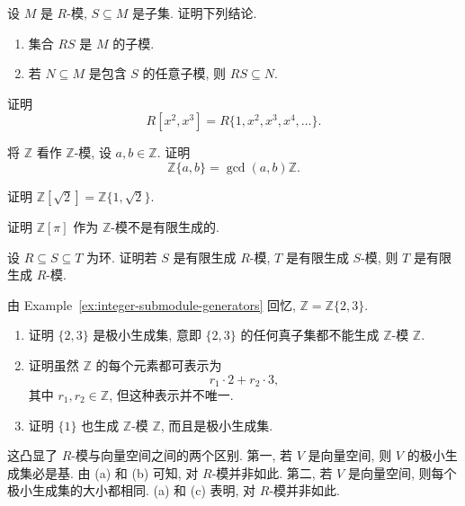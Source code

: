 \BookExerciseHeading
\begin{BookExercises}
  \item\label{ex:smallest-submodule-containing-set} 设 $M$ 是 $R$-模, $S\subseteq M$ 是子集. 证明下列结论.
    \begin{enumerate}[label=(\alph*)]
      \item 集合 $RS$ 是 $M$ 的子模.
      \item 若 $N\subseteq M$ 是包含 $S$ 的任意子模, 则 $RS\subseteq N$.
    \end{enumerate}
  \item\label{ex:polynomial-subalgebra-powers-two-three} 证明
    \[
      R[x^{2},x^{3}]=R\{1,x^{2},x^{3},x^{4},\ldots\}.
    \]
  \item\label{ex:gcd-generates-integer-submodule} 将 $\mathbb{Z}$ 看作 $\mathbb{Z}$-模, 设 $a,b\in\mathbb{Z}$. 证明
    \[
      \mathbb{Z}\{a,b\}=\gcd(a,b)\mathbb{Z}.
    \]
  \item\label{ex:square-root-two-module-generators} 证明 $\mathbb{Z}[\sqrt{2}]=\mathbb{Z}\{1,\sqrt{2}\}$.
  \item\label{ex:pi-not-finite-module} 证明 $\mathbb{Z}[\pi]$ 作为 $\mathbb{Z}$-模不是有限生成的.
  \item\label{ex:finite-module-in-tower} 设 $R\subseteq S\subseteq T$ 为环. 证明若 $S$ 是有限生成 $R$-模, $T$ 是有限生成 $S$-模, 则 $T$ 是有限生成 $R$-模.
  \item\label{ex:minimal-module-generators} 由 Example~\ref{ex:integer-submodule-generators} 回忆, $\mathbb{Z}=\mathbb{Z}\{2,3\}$.
    \begin{enumerate}[label=(\alph*)]
      \item 证明 $\{2,3\}$ 是极小生成集, 意即 $\{2,3\}$ 的任何真子集都不能生成 $\mathbb{Z}$-模 $\mathbb{Z}$.
      \item 证明虽然 $\mathbb{Z}$ 的每个元素都可表示为
        \[
          r_{1}\cdot2+r_{2}\cdot3,
        \]
        其中 $r_{1},r_{2}\in\mathbb{Z}$, 但这种表示并不唯一.
      \item 证明 $\{1\}$ 也生成 $\mathbb{Z}$-模 $\mathbb{Z}$, 而且是极小生成集.
    \end{enumerate}
    这凸显了 $R$-模与向量空间之间的两个区别. 第一, 若 $V$ 是向量空间, 则 $V$ 的极小生成集必是基. 由 (a) 和 (b) 可知, 对 $R$-模并非如此. 第二, 若 $V$ 是向量空间, 则每个极小生成集的大小都相同. (a) 和 (c) 表明, 对 $R$-模并非如此.
\end{BookExercises}
